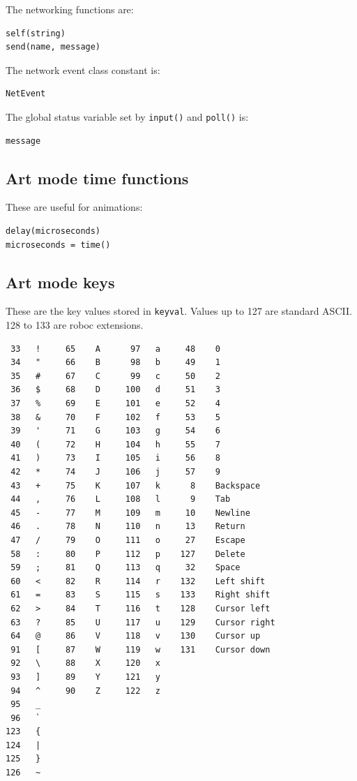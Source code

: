 \documentclass[12pt,a4paper,twoside]{article}
\renewcommand{\_}{\texttt{\symbol{95}}}
\begin{document}
The networking functions are:

\begin{verbatim}
self(string)
send(name, message)
\end{verbatim}

The network event class constant is:

\begin{verbatim}
NetEvent
\end{verbatim}

The global status variable set by \verb^input()^ and \verb^poll()^ is:

\begin{verbatim}
message
\end{verbatim}

\subsection{Art mode time functions}

These are useful for animations:

\begin{verbatim}
delay(microseconds)
microseconds = time()
\end{verbatim}

\newpage
\subsection{Art mode keys}

These are the key values stored in \verb^keyval^.
Values up to 127 are standard ASCII.
128 to 133 are roboc extensions.

\begin{verbatim}
 33   !     65    A      97   a     48    0
 34   "     66    B      98   b     49    1
 35   #     67    C      99   c     50    2
 36   $     68    D     100   d     51    3
 37   %     69    E     101   e     52    4
 38   &     70    F     102   f     53    5
 39   '     71    G     103   g     54    6
 40   (     72    H     104   h     55    7
 41   )     73    I     105   i     56    8
 42   *     74    J     106   j     57    9
 43   +     75    K     107   k      8    Backspace
 44   ,     76    L     108   l      9    Tab
 45   -     77    M     109   m     10    Newline
 46   .     78    N     110   n     13    Return
 47   /     79    O     111   o     27    Escape
 58   :     80    P     112   p    127    Delete
 59   ;     81    Q     113   q     32    Space
 60   <     82    R     114   r    132    Left shift
 61   =     83    S     115   s    133    Right shift
 62   >     84    T     116   t    128    Cursor left
 63   ?     85    U     117   u    129    Cursor right
 64   @     86    V     118   v    130    Cursor up
 91   [     87    W     119   w    131    Cursor down
 92   \     88    X     120   x
 93   ]     89    Y     121   y
 94   ^     90    Z     122   z
 95   _
 96   `
123   {
124   |
125   }
126   ~
\end{verbatim}
\end{document}

